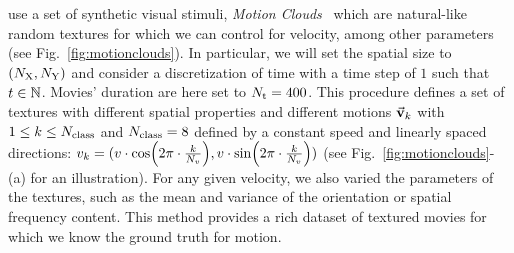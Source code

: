 \documentclass[default]{sn-jnl}%
\theoremstyle{thmstyleone}%
\theoremstyle{thmstyletwo}%
\theoremstyle{thmstylethree}%
\newcommand{\seeFig}[1]{see Fig.~\ref{fig:#1}}%
\begin{document}
use a set of synthetic visual stimuli, \textit{Motion Clouds}~\citep{leon_motion_2012} which are natural-like random textures for which we can control for velocity, among other parameters (\seeFig{motionclouds}). In particular, we will set the spatial size to $(N_\text{X}, N_\text{Y})$ and consider a discretization of time with a time step of $1$ such that $t \in \mathbb{N}$. Movies' duration are here set to $N_\text{t}=400$.
This procedure defines a set of textures with different spatial properties and different motions $\va{v}_k$ with  $1 \le k \le N_\text{class}$ and $N_\text{class}=8$ defined by a constant speed and linearly spaced directions:
$
v_k = 
  ( 
    v \cdot \cos(2\pi\cdot \frac{k}{N_v}),
    v \cdot \sin(2\pi\cdot \frac{k}{N_v})
  )
$ (\seeFig{motionclouds}-(a) for an illustration).
For any given velocity, we also varied the parameters of the textures, such as the mean and variance of the orientation or spatial frequency content. This method provides a rich dataset of textured movies for which we know the ground truth for motion.
%
\end{document}
